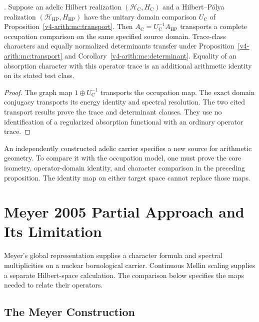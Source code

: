 \begin{proposition}
\label{v4-arith:w9-r4:prop:connes-eq-HPAr}
\ClaimStatusProvedHereConditional. Suppose an adelic Hilbert realization
$(\mathcal H_{\mathrm C},H_{\mathrm C})$ and a Hilbert--P\'olya
realization $(\mathcal H_{\mathrm{HP}},H_{\mathrm{HP}})$ have the
unitary domain comparison $U_{\mathrm C}$ of
Proposition~\ref{v4-arith:mc:transport}.
Then $A_{\mathrm C}=U_{\mathrm C}^{-1}A_{\mathrm{HP}}$ transports
a complete occupation comparison on the same specified source domain.
Trace-class characters and equally normalized determinants transfer
under Proposition~\ref{v4-arith:mc:transport} and
Corollary~\ref{v4-arith:mc:determinant}.
Equality of an absorption character with this operator trace is
an additional arithmetic identity on its stated test class.
\end{proposition}
\begin{proof}
The graph map $1\oplus U_{\mathrm C}^{-1}$ transports the occupation
map. The exact domain conjugacy transports its energy identity and
spectral resolution. The two cited transport results prove the trace
and determinant clauses. They use no identification of a regularized
absorption functional with an ordinary operator trace.
\end{proof}

\begin{remark}
\label{v4-arith:w9-r4:rem:adele-transfers}
An independently constructed adelic carrier specifies a new source
for arithmetic geometry. To compare it with the occupation model,
one must prove the core isometry, operator-domain identity, and
character comparison in the preceding proposition. The identity map
on either target space cannot replace those maps.
\end{remark}

\section{Meyer 2005 Partial Approach and Its Limitation}
\label{v4-arith:w9-r4:meyer-2005}

Meyer's global representation supplies a character formula and
spectral multiplicities on a nuclear bornological carrier. Continuous
Mellin scaling supplies a separate Hilbert-space calculation. The
comparison below specifies the maps needed to relate their operators.

\subsection{The Meyer Construction}
\label{v4-arith:w9-r4:meyer-2005:construction}

